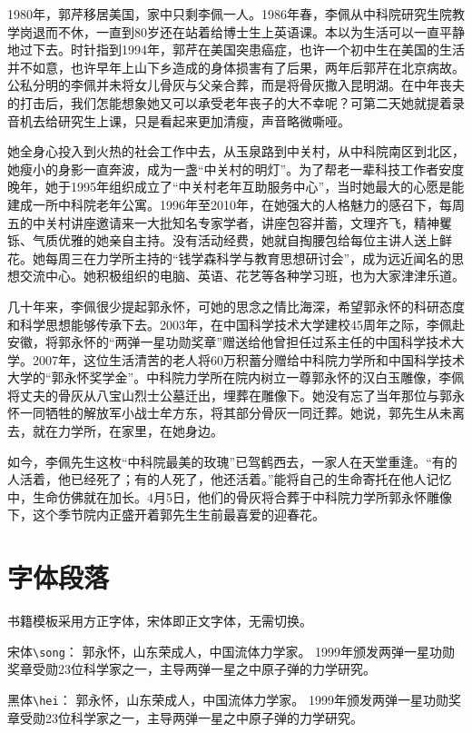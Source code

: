 1980年，郭芹移居美国，家中只剩李佩一人。1986年春，李佩从中科院研究生院教学岗退而不休，一直到80岁还在站着给博士生上英语课。本以为生活可以一直平静地过下去。时针指到1994年，郭芹在美国突患癌症，也许一个初中生在美国的生活并不如意，也许早年上山下乡造成的身体损害有了后果，两年后郭芹在北京病故。公私分明的李佩并未将女儿骨灰与父亲合葬，而是将骨灰撒入昆明湖。在中年丧夫的打击后，我们怎能想象她又可以承受老年丧子的大不幸呢？可第二天她就提着录音机去给研究生上课，只是看起来更加清瘦，声音略微嘶哑。

她全身心投入到火热的社会工作中去，从玉泉路到中关村，从中科院南区到北区，她瘦小的身影一直奔波，成为一盏“中关村的明灯”。为了帮老一辈科技工作者安度晚年，她于1995年组织成立了“中关村老年互助服务中心”，当时她最大的心愿是能建成一所中科院老年公寓。1996年至2010年，在她强大的人格魅力的感召下，每周五的中关村讲座邀请来一大批知名专家学者，讲座包容并蓄，文理齐飞，精神矍铄、气质优雅的她亲自主持。没有活动经费，她就自掏腰包给每位主讲人送上鲜花。她每周三在力学所主持的“钱学森科学与教育思想研讨会”，成为远近闻名的思想交流中心。她积极组织的电脑、英语、花艺等各种学习班，也为大家津津乐道。

几十年来，李佩很少提起郭永怀，可她的思念之情比海深，希望郭永怀的科研态度和科学思想能够传承下去。2003年，在中国科学技术大学建校45周年之际，李佩赴安徽，将郭永怀的“两弹一星功勋奖章”赠送给他曾担任过系主任的中国科学技术大学。2007年，这位生活清苦的老人将60万积蓄分赠给中科院力学所和中国科学技术大学的“郭永怀奖学金”。中科院力学所在院内树立一尊郭永怀的汉白玉雕像，李佩将丈夫的骨灰从八宝山烈士公墓迁出，埋葬在雕像下。她没有忘了当年那位与郭永怀一同牺牲的解放军小战士牟方东，将其部分骨灰一同迁葬。她说，郭先生从未离去，就在力学所，在家里，在她身边。

如今，李佩先生这枚“中科院最美的玫瑰”已驾鹤西去，一家人在天堂重逢。“有的人活着，他已经死了；有的人死了，他还活着。”能将自己的生命寄托在他人记忆中，生命仿佛就在加长。4月5日，他们的骨灰将合葬于中科院力学所郭永怀雕像下，这个季节院内正盛开着郭先生生前最喜爱的迎春花。

\section{字体段落}
\label{sec:font}

书籍模板采用方正字体，宋体即正文字体，无需切换。

宋体\verb|\song|：%
郭永怀，山东荣成人，中国流体力学家。
1999年颁发两弹一星功勋奖章受勋23位科学家之一，主导两弹一星之中原子弹的力学研究。

{\hei 黑体\verb|\hei|：%
郭永怀，山东荣成人，中国流体力学家。
1999年颁发两弹一星功勋奖章受勋23位科学家之一，主导两弹一星之中原子弹的力学研究。}

